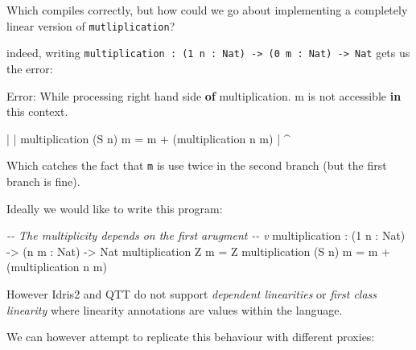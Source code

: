 \documentclass[
]{article}
\newenvironment{Shaded}{}{}
\newcommand{\CommentTok}[1]{\textcolor[rgb]{0.38,0.63,0.69}{\textit{#1}}}
\newcommand{\DataTypeTok}[1]{\textcolor[rgb]{0.56,0.13,0.00}{#1}}
\newcommand{\DecValTok}[1]{\textcolor[rgb]{0.25,0.63,0.44}{#1}}
\newcommand{\FunctionTok}[1]{\textcolor[rgb]{0.02,0.16,0.49}{#1}}
\newcommand{\KeywordTok}[1]{\textcolor[rgb]{0.00,0.44,0.13}{\textbf{#1}}}
\newcommand{\NormalTok}[1]{#1}
\newcommand{\OperatorTok}[1]{\textcolor[rgb]{0.40,0.40,0.40}{#1}}
\newcommand{\OtherTok}[1]{\textcolor[rgb]{0.00,0.44,0.13}{#1}}
\begin{document}
Which compiles correctly, but how could we go about implementing a
completely linear version of \texttt{mutliplication}?

indeed, writing
\texttt{multiplication\ :\ (1\ n\ :\ Nat)\ -\textgreater{}\ (0\ m\ :\ Nat)\ -\textgreater{}\ Nat}
gets us the error:

\begin{Shaded}
\begin{Highlighting}[]
\DataTypeTok{Error}\OperatorTok{:} \DataTypeTok{While}\NormalTok{ processing right hand side }\KeywordTok{of}\NormalTok{ multiplication}\OperatorTok{.}\NormalTok{ m is }\FunctionTok{not}\NormalTok{ accessible }\KeywordTok{in}\NormalTok{ this context}\OperatorTok{.}

    \OperatorTok{|}
    \OperatorTok{|}\NormalTok{ multiplication (}\DataTypeTok{S}\NormalTok{ n) m }\OtherTok{=}\NormalTok{ m }\OperatorTok{+}\NormalTok{ (multiplication n m)}
    \OperatorTok{|}                          \OperatorTok{\^{}}
\end{Highlighting}
\end{Shaded}

Which catches the fact that \texttt{m} is use twice in the second branch
(but the first branch is fine).

Ideally we would like to write this program:

\begin{Shaded}
\begin{Highlighting}[]
\CommentTok{{-}{-}        The multiplicity depends on the first arugment}
\CommentTok{{-}{-}                               v}
\NormalTok{multiplication }\OperatorTok{:}\NormalTok{ (}\DecValTok{1}\NormalTok{ n }\OperatorTok{:} \DataTypeTok{Nat}\NormalTok{) }\OtherTok{{-}\textgreater{}}\NormalTok{ (n m }\OperatorTok{:} \DataTypeTok{Nat}\NormalTok{) }\OtherTok{{-}\textgreater{}} \DataTypeTok{Nat}
\NormalTok{multiplication }\DataTypeTok{Z}\NormalTok{ m }\OtherTok{=} \DataTypeTok{Z}
\NormalTok{multiplication (}\DataTypeTok{S}\NormalTok{ n) m }\OtherTok{=}\NormalTok{ m }\OperatorTok{+}\NormalTok{ (multiplication n m)}
\end{Highlighting}
\end{Shaded}

However Idris2 and QTT do not support \emph{dependent linearities} or
\emph{first class linearity} where linearity annotations are values
within the language.

We can however attempt to replicate this behaviour with different
proxies:
\end{document}

